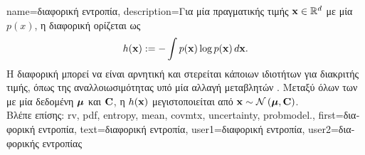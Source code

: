 {name={\foreignlanguage{greek}{διαφορική εντροπία}},
	description={\foreignlanguage{greek}{Για μία}  
		\foreignlanguage{greek}{πραγματικής τιμής ${\bf x} \in \mathbb{R}^{d}$ με μία}
		 $p(x)$, \foreignlanguage{greek}{η διαφορική}  
		\foreignlanguage{greek}{ορίζεται ως} \cite{coverthomas}
		\[
		h({\bf x}) := - \int p({\bf x}) \log p({\bf x}) \, d{\bf x}.
		\]
		\foreignlanguage{greek}{Η διαφορική}  \foreignlanguage{greek}{μπορεί να είναι αρνητική 
		και στερείται κάποιων ιδιοτήτων}  \foreignlanguage{greek}{για}  
		\foreignlanguage{greek}{διακριτής τιμής, όπως της αναλλοιωσιμότητας υπό μία αλλαγή μεταβλητών} \cite{coverthomas}. 
		\foreignlanguage{greek}{Μεταξύ όλων των}  \foreignlanguage{greek}{με μία δεδομένη} 
		 ${\bm \mu}$ \foreignlanguage{greek}{και}  ${\bf C}$, 
		\foreignlanguage{greek}{η $h({\bf x})$ μεγιστοποιείται από} ${\bf x} \sim \mathcal{N}\left({\bm \mu},{\bf C}\right)$. \\
		\foreignlanguage{greek}{Βλέπε επίσης:} \gls{rv}, \gls{pdf}, \gls{entropy}, \gls{mean}, \gls{covmtx}, \gls{uncertainty}, \gls{probmodel}.},
	first={\foreignlanguage{greek}{διαφορική εντροπία}},
	text={\foreignlanguage{greek}{διαφορική εντροπία}},
	user1={\foreignlanguage{greek}{διαφορική εντροπία}}, %
  	user2={\foreignlanguage{greek}{διαφορικής εντροπίας}} %
}

